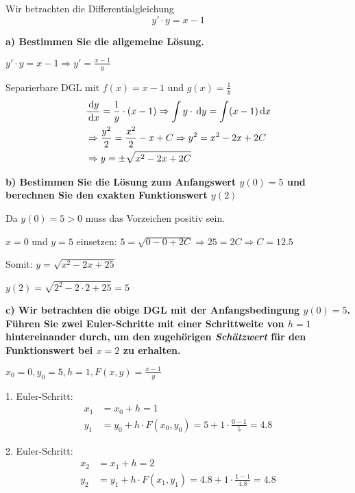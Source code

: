 \newpage


Wir betrachten die Differentialgleichung \[y' \cdot y = x - 1\]

\begin{multicols}{2}
    \textbf{a) Bestimmen Sie die allgemeine Lösung.}

    $y' \cdot y = x - 1 \Rightarrow y' = \frac{x - 1}{y}$

    Separierbare DGL mit $f(x) = x - 1$ und $g(x) = \frac{1}{y}$
    \begin{align*}
        &\frac{\,\mathrm{d}y}{\,\mathrm{d}x} = \frac{1}{y} \cdot (x - 1) \Rightarrow \int y \cdot \,\mathrm{d}y = \int (x - 1) \,\mathrm{d}x \\
        &\Rightarrow \frac{y^2}{2} = \frac{x^2}{2} - x + C \Rightarrow y^2 = x^2 - 2x + 2C \\
        &\Rightarrow y = \pm \sqrt {x^2 - 2x + 2C}
    \end{align*}

    \columnbreak

    \textbf{b) Bestimmen Sie die Lösung zum Anfangswert $y(0) = 5$ und berechnen Sie den exakten Funktionswert $y(2)$}

    Da $y(0) = 5 > 0$ muss das Vorzeichen positiv sein.

    $x = 0$ und $y = 5$ einsetzen: $5 = \sqrt {0 - 0 + 2C} \Rightarrow 25 = 2C \Rightarrow C = 12.5$

    Somit: $y = \sqrt {x^2 - 2x + 25}$

    $y(2) = \sqrt {2^2 - 2 \cdot 2 + 25} = 5$
\end{multicols}

\textbf{c) Wir betrachten die obige DGL mit der Anfangsbedingung $y(0) = 5$.
Führen Sie zwei Euler-Schritte mit einer Schrittweite von $h = 1$ hintereinander durch, um den zugehörigen \emph{Schätzwert} für den Funktionswert bei $x = 2$ zu erhalten.}

$x_0 = 0, y_0 = 5, h = 1, F(x,y) = \frac{x-1}{y}$

\begin{multicols}{2}
    1. Euler-Schritt:
    \begin{align*}
        x_1 &= x_0 + h = 1 \\
        y_1 &= y_0 + h \cdot F(x_0, y_0) = 5 + 1 \cdot \frac{0 - 1}{5} = 4.8
    \end{align*}

    2. Euler-Schritt:
    \begin{align*}
        x_2 &= x_1 + h = 2 \\
        y_2 &= y_1 + h \cdot F(x_1, y_1) = 4.8 + 1 \cdot \frac{1 - 1}{4.8} = 4.8
    \end{align*}
\end{multicols}

